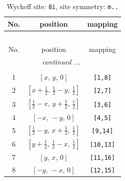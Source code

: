 \documentclass[fleqn,8pt]{jsarticle}
\begin{document}
\renewcommand{\arraystretch}{1.2}
\begin{longtable}{ccc}
\caption{Wyckoff site: {\tt 8i}, site symmetry: {\tt m..}}
 \\
 \hline \hline
No. & position & mapping \\ \hline \endfirsthead

\multicolumn{2}{l}{\tablename\ \thetable{}} \\
 \hline \hline
No. & position & mapping \\ \hline \endhead

 \hline \hline
\multicolumn{2}{r}{\footnotesize\it continued ...} \\ \endfoot

 \hline \hline
\multicolumn{2}{r}{} \\ \endlastfoot

1 & $\left[ x,\, y,\, 0 \right]$ & {\tt [1,8]} \\ \hline
2 & $\left[ x + \frac{1}{2},\, \frac{1}{2} - y,\, \frac{1}{2} \right]$ & {\tt [2,7]} \\ \hline
3 & $\left[ \frac{1}{2} - x,\, y + \frac{1}{2},\, \frac{1}{2} \right]$ & {\tt [3,6]} \\ \hline
4 & $\left[ - x,\, - y,\, 0 \right]$ & {\tt [4,5]} \\ \hline
5 & $\left[ \frac{1}{2} - y,\, x + \frac{1}{2},\, \frac{1}{2} \right]$ & {\tt [9,14]} \\ \hline
6 & $\left[ y + \frac{1}{2},\, \frac{1}{2} - x,\, \frac{1}{2} \right]$ & {\tt [10,13]} \\ \hline
7 & $\left[ y,\, x,\, 0 \right]$ & {\tt [11,16]} \\ \hline
8 & $\left[ - y,\, - x,\, 0 \right]$ & {\tt [12,15]} \\
\end{longtable}
\renewcommand{\arraystretch}{1.2}
\end{document}
